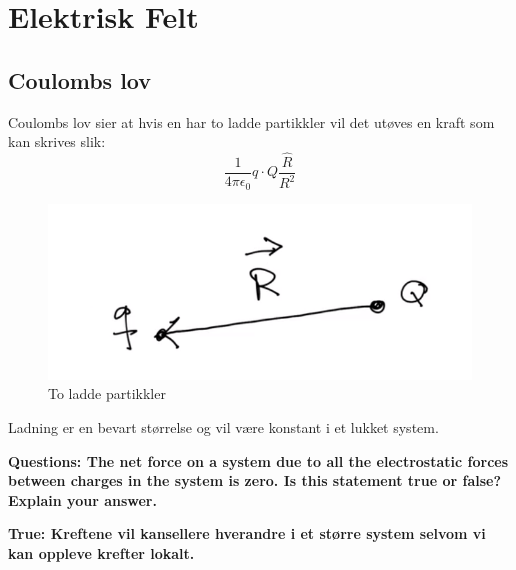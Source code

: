 \chapter{Elektrisk Felt}
  \section*{Coulombs lov}
    Coulombs lov sier at hvis en har to ladde partikkler vil det utøves en kraft som kan skrives slik:
    \[
    \frac{1}{4 π \epsilon_{0}} q ⋅ Q \frac{\hat{R}}{R^{2}}
    \]

    \begin{figure}[h!]
      \centering
      \includegraphics[scale = .7]{Bilder/Coulombs_lov.png}
      \caption{To ladde partikkler}
      \label{fig: Ladde partikkler}
    \end{figure}
  Ladning er en bevart størrelse og vil være konstant i et lukket system. \newline 

  \bf  Questions: The net force on a system due to all the electrostatic forces between charges in the system is zero. Is this statement true or false? Explain your answer. \newline \newline  
  
  \bf{True}: Kreftene vil kansellere hverandre i et større system selvom vi kan oppleve krefter lokalt. 

  